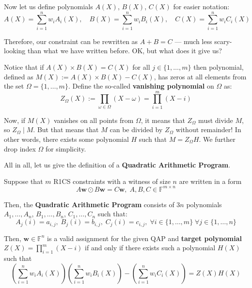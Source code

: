 \documentclass[../lecture-notes.tex]{subfiles}
\begin{document}
Now let us define polynomials $A(X)$, $B(X)$, $C(X)$ for easier notation: 
\begin{equation*}
    A(X) = \sum_{i = 1}^{n} w_iA_i(X), \quad B(X) = \sum_{i = 1}^{n} w_iB_i(X), \quad C(X) = \sum_{i = 1}^{n} w_iC_i(X)
\end{equation*}

Therefore, our constraint can be rewritten as $A + B = C$ --- much less scary-looking than what we have written before. OK, but what does it give us? 

Notice that if $A(X) \times B(X)=C(X)$ for all $j \in \{1,\dots,m\}$ then polynomial, defined as $M(X) := A(X) \times B(X)-C(X)$, has zeros at all elements from the set $\Omega = \{1,\dots,m\}$. Define the so-called \textbf{vanishing polynomial} on $\Omega$ as:
\begin{equation*}
    Z_{\Omega}(X) := \prod_{\omega \in \Omega} (X - \omega) = \prod_{i=1}^m (X - i)
\end{equation*} 

Now, if $M(X)$ vanishes on all points from $\Omega$, it means that $Z_{\Omega}$ must divide $M$, so $Z_{\Omega} \mid M$. But that means
that $M$ can be divided by $Z_{\Omega}$ without remainder! In other words, there exists some polynomial $H$ such that $M=Z_{\Omega}H$. We further drop index $\Omega$ for simplicity. 

All in all, let us give the definition of a \textbf{Quadratic Arithmetic Program}.

\begin{definition}
    Suppose that $m$ R1CS constraints with a witness of size $n$ are written in a form
    \begin{equation*}
        A\mathbf{w} \odot B\mathbf{w} = C\mathbf{w}, \; A,B,C \in \mathbb{F}^{m \times n}
    \end{equation*}

    Then, the \textbf{Quadratic Arithmetic Program} consists of $3n$ polynomials $A_1,\dots,A_n$, $B_1,\dots,B_n$, $C_1,\dots,C_n$ such that:
    \begin{equation*}
        A_j(i) = a_{i,j}, \; B_j(i) = b_{i,j}, \; C_j(i) = c_{i,j}, \; \forall i \in \{1,\dots,m\} \; \forall j \in \{1,\dots,n\}
    \end{equation*}

    Then, $\mathbf{w} \in \mathbb{F}^n$ is a valid assignment for the given QAP and \textbf{target polynomial} $Z(X) = \prod_{i=1}^m (X-i)$ if and only if there exists such a polynomial $H(X)$ such that
    \begin{equation*}
        \left( \sum_{i = 1}^{n} w_iA_i(X) \right)\left( \sum_{i = 1}^{n} w_iB_i(X) \right) - \left( \sum_{i = 1}^{n} w_iC_i(X) \right) = Z(X)H(X)
    \end{equation*}
\end{definition}
\end{document}
